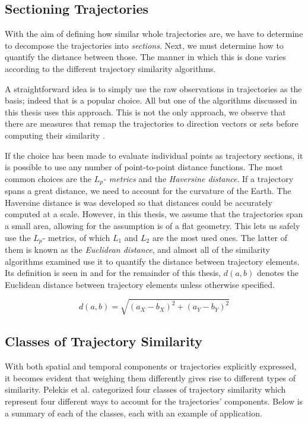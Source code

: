 \subsection{Sectioning Trajectories}

With the aim of defining how similar whole trajectories are, we have to determine to decompose the trajectories into \textit{sections}. 
Next, we must determine how to quantify the distance between those.
The manner in which this is done varies according to the different trajectory similarity algorithms. 


A straightforward idea is to simply use the raw observations in trajectories as the basis; indeed that is a popular choice. 
All but one of the algorithms discussed in this thesis uses this approach.
This is not the only approach, we observe that there are measures that remap the trajectories to direction vectors or sets before computing their similarity \cite{31-ShapebasedSimilarity, 88-SetbasedSimilarity}.

If the choice has been made to evaluate individual points as trajectory sections, it is possible to use any number of point-to-point distance functions.
The most common choices are the \textit{$L_p$- metrics} and the \textit{Haversine distance}.
If a trajectory spans a great distance, we need to account for the curvature of the Earth. 
The Haversine distance is was developed so that distances could be accurately computed at a scale. 
However, in this thesis, we assume that the trajectories span a small area, allowing for the assumption is of a flat geometry.
This lets us safely use the $L_p$- metrics, of which $L_1$ and $L_2$ are the most used ones. 
The latter of them is known as the \textit{Euclidean distance}, and almost all of the similarity algorithms examined use it to quantify the distance between trajectory elements.
Its definition is seen in  and for the remainder of this thesis, $d(a, b)$ denotes the Euclidean distance between trajectory elements unless otherwise specified.   

\begin{equation}\label{eq:l2norm}
d(a, b) = \sqrt{(a_X - b_X)^2 + (a_Y - b_Y)^2}
\end{equation}

 


\subsection{Classes of Trajectory Similarity}
With both spatial and temporal components or trajectories explicitly expressed, it becomes evident that weighing them differently gives rise to different types of similarity. 
Pelekis et al. categorized four classes of trajectory similarity which represent four different ways to account for the trajectories' components\cite{32-SimilaritySearch}. 
Below is a summary of each of the classes, each with an example of application. 

